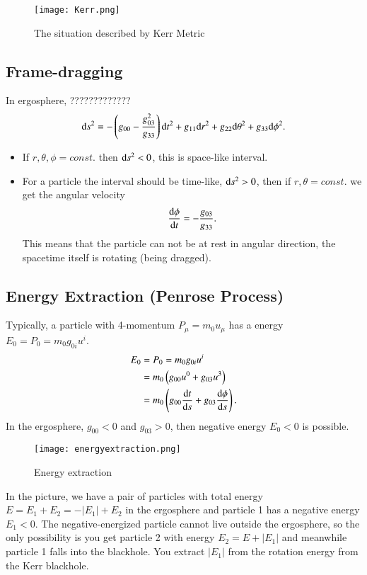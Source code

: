 \documentclass[openany,10pt]{book}
\theoremstyle{definition}
\theoremstyle{definition}
\theoremstyle{remark}
\begin{document}
\begin{figure}[htbp]
    \centering
    \texttt{[image: Kerr.png]}
    \caption{The situation described by Kerr Metric}
    \label{Kerr}
\end{figure}


\subsection{Frame-dragging}
In ergosphere,  ?????????????
\begin{equation}
        {\rm d}s^2=-\left(g_{00}-\frac{g_{03}^2}{g_{33}}\right){\rm d}t^2+g_{11}{\rm d}r^2+g_{22}{\rm d}\theta^2+g_{33}{\rm d}\phi^2.
\end{equation}
\begin{itemize} 
    \item If $r, \theta, \phi=const.$ then ${\rm d}s^2<0$, this is space-like interval.
    \item For a particle the interval should be time-like, ${\rm d}s^2>0$, then if $r, \theta=const.$ we get the angular velocity
    \begin{equation}
        \frac{{\rm d}\phi}{{\rm d}t}=-\frac{g_{03}}{g_{33}}.
    \end{equation}
    This means that the particle can not be at rest in angular direction, the spacetime itself is rotating (being dragged).
\end{itemize}

\subsection{Energy Extraction (Penrose Process)}
Typically, a particle with 4-momentum $P_\mu=m_0 u_\mu$ has a energy $E_0=P_0=m_0 g_{0i}u^i$.
\begin{equation}\begin{aligned}
    E_0&=P_0=m_0 g_{0i}u^i\\
    &=m_0\left(g_{00}u^0+g_{03}u^3\right)\\
    &=m_0\left(g_{00}\frac{{\rm d}t}{{\rm d}s}+g_{03}\frac{{\rm d}\phi}{{\rm d}s}\right).
\end{aligned}
\end{equation}
In the ergosphere, $g_{00}<0$ and $g_{03}>0$, then negative energy $E_0<0$ is possible.

\begin{figure}[htbp]
    \centering
    \texttt{[image: energyextraction.png]}
    \caption{Energy extraction}
    \label{energyextraction}
\end{figure}
In the picture, we have a pair of particles with total energy $E=E_1+E_2=-|E_1|+E_2$ in the ergosphere and particle 1 has a negative energy $E_1<0$. The negative-energized particle  cannot live outside the ergosphere, so the only possibility is you get particle 2 with energy $E_2=E+|E_1|$ and meanwhile particle 1 falls into the blackhole. You extract $|E_1|$ from the rotation energy from the Kerr blackhole.
\end{document}

